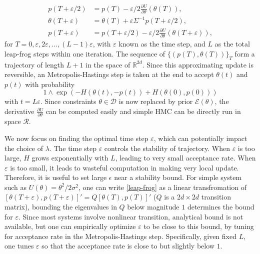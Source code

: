 \documentclass[10pt]{article}
\newcommand{\mc}[1]{\mathcal{#1}}
\begin{document}
\begin{equation}
\begin{aligned}
\label{leap-frog}
p(T+ \varepsilon/2) & = p(T) - \varepsilon/2 \frac{\partial U}{\partial  \theta } ( \theta (T)),\\
 \theta (T + \varepsilon) & =  \theta (T) + \varepsilon \Sigma^{-1}p(T+  \varepsilon/2),\\
p(T+ \varepsilon) &= p(T+ \varepsilon/2) - \varepsilon/2 \frac{\partial U}{\partial  \theta } ( \theta (T + \varepsilon)),
\end{aligned}
\end{equation}
for $T=0,\varepsilon, 2\varepsilon,\ldots, (L-1)\varepsilon$, with $\varepsilon$ known as the time step, and $L$ as the total leap-frog steps within one iteration. The sequence of $\{(p(T),\theta(T))\}_T$ form a trajectory of length $L+1$ in the space of $\mathbb R^{2d}$. Since this approximating update is reversible, an Metropolis-Hastings step is taken at the end to accept $\theta(t)$ and $p(t)$ with probability 
$$1\wedge \exp  \left( - H(\theta(t),-p(t)) + H(\theta(0),p(0))\right)$$
 with $t=L\varepsilon$. Since constraints $\theta \in \mc D$ is now replaced by prior $\mc E(\theta)$, the derivative $\frac{\partial U}{\partial  \theta }$ can be computed easily and simple HMC can be directly run in space $\mc R$.

We now focus on finding the optimal time step $\varepsilon$, which can potentially impact the choice of $\lambda$. The time step $\varepsilon$ controls the stability of trajectory. When $\varepsilon$ is too large, $H$ grows exponentially with $L$, leading to very small acceptance rate. When $\varepsilon$ is too small, it leads to wasteful computation in making very local update. Therefore, it is useful to set large $\epsilon$ near a stability bound. For simple system such as $U(\theta)= {\theta^2}/{2\sigma^2}$, one can write \eqref{leap-frog} as a linear transfromation of $[\theta(T+\varepsilon),p(T+\varepsilon)]' = Q [ \theta(T),p(T)]'$ ($Q$ is a $2d\times 2d$ transition matrix), bounding the eigenvalues in $Q$ below magnitude $1$ determines the bound for $\varepsilon$. Since most systems involve nonlinear transition, analytical bound is not available, but one can empirically optimize $\varepsilon$ to be close to this bound, by tuning for acceptance rate in the Metropolis-Hastings step. Specifically, given fixed $L$, one tunes $\varepsilon$ so that the acceptance rate is close to but slightly below $1$.
\end{document}
